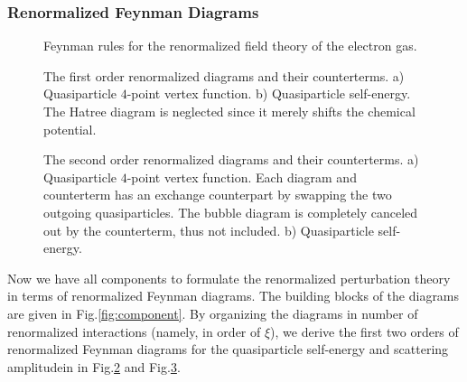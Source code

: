 \documentclass[reprint,amsmath,amssymb,aps,prb]{revtex4-1}
\begin{document}
\subsubsection{Renormalized Feynman Diagrams}

\begin{figure}
    \centering
    \resizebox{0.8\linewidth}{!}{
        
    }
    \caption{Feynman rules for the renormalized field theory of the electron gas.}
    \label{fig:component}
\end{figure}

\begin{figure}
    \centering
    \begin{subfigure}{\linewidth}
        \resizebox{0.9\linewidth}{!}{
            
        }
        \caption{ }
    \end{subfigure}
    \begin{subfigure}{\linewidth}
        \resizebox{0.75\linewidth}{!}{
            
        }
        \caption{ }
    \end{subfigure}
    \caption{The first order renormalized diagrams and their counterterms.
        a) Quasiparticle $4$-point vertex function.
        b) Quasiparticle self-energy. The Hatree diagram is neglected since it merely shifts the chemical potential.}
    \label{fig:order1}
\end{figure}

\begin{figure}
    \centering
    \begin{subfigure}{\linewidth}
        \resizebox{0.75\linewidth}{!}{
            
        }
        \caption{}
    \end{subfigure}
    \begin{subfigure}{\linewidth}
        \resizebox{0.75\linewidth}{!}{
            
        }
        \caption{ }
    \end{subfigure}
    \caption{The second order renormalized diagrams and their counterterms.
        a) Quasiparticle $4$-point vertex function. Each diagram and counterterm has an
        exchange counterpart by swapping the two outgoing quasiparticles. The bubble diagram is completely
        canceled out by the counterterm, thus not included.
        b) Quasiparticle self-energy.}
    \label{fig:order2}
\end{figure}


Now we have all components to formulate the renormalized perturbation theory in terms of renormalized Feynman diagrams.
The building blocks of the diagrams are given in Fig.\eqref{fig:component}. By organizing the
diagrams in number of renormalized interactions (namely, in order of $\xi$),
we derive the first two orders of renormalized Feynman diagrams for the quasiparticle
self-energy and scattering amplitudein in Fig.\ref{fig:order1} and Fig.\ref{fig:order2}.
\end{document}

